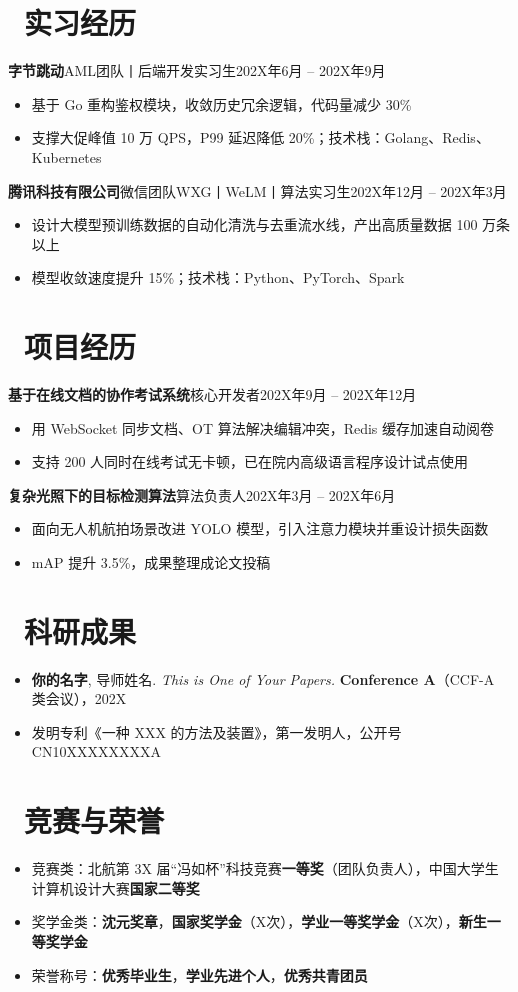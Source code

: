 \documentclass[11pt]{article}
\newcommand{\cvsection}[2]{%
  \section{\texorpdfstring{\makebox[\widthof{\faGraduationCap}][c]{\color{CVBlue}#1}\ #2}{#2}}}
\newcommand{\cventry}[3]{{\parfillskip=0pt\relax\noindent\textbf{#1}\quad #2\hfill#3\par}}
\begin{document}
\cvsection{\faBriefcase}{实习经历}

\cventry{字节跳动}{AML团队丨后端开发实习生}{202X年6月 -- 202X年9月}
\begin{itemize}[topsep=0em]
	\item 基于 Go 重构鉴权模块，收敛历史冗余逻辑，代码量减少 30\%
	\item 支撑大促峰值 10 万 QPS，P99 延迟降低 20\%；技术栈：Golang、Redis、Kubernetes
\end{itemize}

\cventry{腾讯科技有限公司}{微信团队WXG丨WeLM丨算法实习生}{202X年12月 -- 202X年3月}
\begin{itemize}[topsep=0em]
	\item 设计大模型预训练数据的自动化清洗与去重流水线，产出高质量数据 100 万条以上
	\item 模型收敛速度提升 15\%；技术栈：Python、PyTorch、Spark
\end{itemize}

\cvsection{\faCode}{项目经历}

\cventry{基于在线文档的协作考试系统}{核心开发者}{202X年9月 -- 202X年12月}
\begin{itemize}[topsep=0em]
	\item 用 WebSocket 同步文档、OT 算法解决编辑冲突，Redis 缓存加速自动阅卷
	\item 支持 200 人同时在线考试无卡顿，已在院内高级语言程序设计试点使用
\end{itemize}

\cventry{复杂光照下的目标检测算法}{算法负责人}{202X年3月 -- 202X年6月}
\begin{itemize}[topsep=0em]
	\item 面向无人机航拍场景改进 YOLO 模型，引入注意力模块并重设计损失函数
	\item mAP 提升 3.5\%，成果整理成论文投稿
\end{itemize}

\cvsection{\faFlask}{科研成果}
\begin{itemize}
	\item \textbf{你的名字}, 导师姓名. \textit{This is One of Your Papers.} \textbf{Conference A}（CCF-A 类会议），202X
	\item 发明专利《一种 XXX 的方法及装置》，第一发明人，公开号 CN10XXXXXXXXA
\end{itemize}

\cvsection{\faTrophy}{竞赛与荣誉}
\begin{itemize}
	\item 竞赛类：北航第 3X 届“冯如杯”科技竞赛\textbf{一等奖}（团队负责人），中国大学生计算机设计大赛\textbf{国家二等奖}
	\item 奖学金类：\textbf{沈元奖章}，\textbf{国家奖学金}（X次），\textbf{学业一等奖学金}（X次），\textbf{新生一等奖学金}
	\item 荣誉称号：\textbf{优秀毕业生}，\textbf{学业先进个人}，\textbf{优秀共青团员}
\end{itemize}
\end{document}
